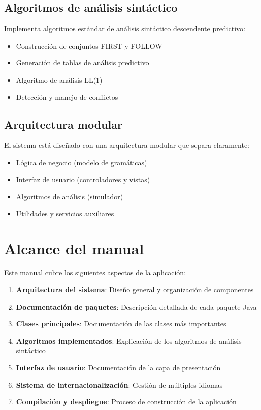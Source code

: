 \subsection{Algoritmos de análisis sintáctico}
Implementa algoritmos estándar de análisis sintáctico descendente predictivo:
\begin{itemize}
    \item Construcción de conjuntos FIRST y FOLLOW
    \item Generación de tablas de análisis predictivo
    \item Algoritmo de análisis LL(1)
    \item Detección y manejo de conflictos
\end{itemize}

\subsection{Arquitectura modular}
El sistema está diseñado con una arquitectura modular que separa claramente:
\begin{itemize}
    \item Lógica de negocio (modelo de gramáticas)
    \item Interfaz de usuario (controladores y vistas)
    \item Algoritmos de análisis (simulador)
    \item Utilidades y servicios auxiliares
\end{itemize}

\section{Alcance del manual}

Este manual cubre los siguientes aspectos de la aplicación:

\begin{enumerate}
    \item \textbf{Arquitectura del sistema}: Diseño general y organización de componentes
    \item \textbf{Documentación de paquetes}: Descripción detallada de cada paquete Java
    \item \textbf{Clases principales}: Documentación de las clases más importantes
    \item \textbf{Algoritmos implementados}: Explicación de los algoritmos de análisis sintáctico
    \item \textbf{Interfaz de usuario}: Documentación de la capa de presentación
    \item \textbf{Sistema de internacionalización}: Gestión de múltiples idiomas
    \item \textbf{Compilación y despliegue}: Proceso de construcción de la aplicación
\end{enumerate}

